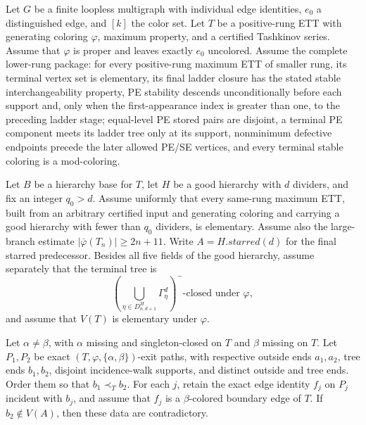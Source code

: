 \begin{lemma}
Let $G$ be a finite loopless multigraph with individual edge identities,
$e_0$ a distinguished edge, and $[k]$ the color set.  Let $T$ be a
positive-rung ETT with generating coloring $\varphi$, maximum property,
and a certified Tashkinov series.  Assume that $\varphi$ is proper and
leaves exactly $e_0$ uncolored.  Assume the complete lower-rung package:
for every positive-rung maximum ETT of smaller rung, its terminal vertex
set is elementary, its final ladder closure has the stated stable
interchangeability property, PE stability descends unconditionally before each support and, only when
the first-appearance index is greater than one, to the preceding ladder
stage; equal-level PE stored pairs are disjoint, a terminal PE component meets its ladder tree
only at its support, nonminimum defective endpoints precede the later
allowed PE/SE vertices, and every terminal stable coloring is a
mod-coloring.

Let $B$ be a hierarchy base for $T$, let $H$ be a good hierarchy with
$d$ dividers, and fix an integer $q_0>d$.  Assume uniformly that every
same-rung maximum ETT, built from an arbitrary certified input and
generating coloring and carrying a good hierarchy with fewer than $q_0$
dividers, is elementary.  Assume also the large-branch estimate
$|\overline\varphi(T_n)|\geq 2n+11$.  Write
$A=H.\mathit{starred}(d)$ for the final starred predecessor.  Besides all
five fields of the good hierarchy, assume separately that the terminal
tree is
\[
 \left(\bigcup_{\eta\in D^H_{n,d+1}}\Gamma^d_\eta\right)^-
 \text{-closed under }\varphi,
\]
and assume that $V(T)$ is elementary under $\varphi$.

Let $\alpha\ne\beta$, with $\alpha$ missing and singleton-closed on $T$
and $\beta$ missing on $T$.  Let $P_1,P_2$ be exact
$(T,\varphi,\{\alpha,\beta\})$-exit paths, with respective outside ends
$a_1,a_2$, tree ends $b_1,b_2$, disjoint incidence-walk supports, and
distinct outside and tree ends.  Order them so that $b_1\prec_T b_2$.
For each $j$, retain the exact edge identity $f_j$ on $P_j$ incident
with $b_j$, and assume that $f_j$ is a $\beta$-colored boundary edge of
$T$.  If $b_2\notin V(A)$, then these data are contradictory.
\end{lemma}
